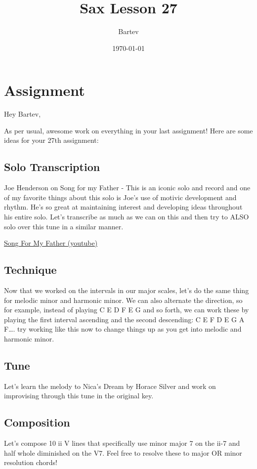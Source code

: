 \documentclass[11pt]{article}
\author{Bartev}
\date{\today}
\title{Sax Lesson 27}
\let\maketitle\relax %
\begin{document}
\maketitle
\tableofcontents


\section{Assignment}
\label{sec:org02bc423}

Hey Bartev,

As per usual, awesome work on everything in your last assignment! Here are some ideas for your 27th assignment:

\subsection{Solo Transcription}
\label{sec:orgd719371}
Joe Henderson on Song for my Father - This is an iconic solo and record and one of my favorite things about this solo is Joe's use of motivic development and rhythm. He's so great at maintaining interest and developing ideas throughout his entire solo. Let's transcribe as much as we can on this and then try to ALSO solo over this tune in a similar manner.

\href{https://www.youtube.com/watch?v=CWeXOm49kE0}{Song For My Father (youtube)}

\subsection{Technique}
\label{sec:orgcfe0885}
Now that we worked on the intervals in our major scales, let's do the same thing for melodic minor and harmonic minor. We can also alternate the direction, so for example, instead of playing C E D F E G and so forth, we can work these by playing the first interval ascending and the second descending: C E F D E G A F\ldots{}. try working like this now to change things up as you get into melodic and harmonic minor.


\subsection{Tune}
\label{sec:orgdaf4d02}
Let's learn the melody to Nica's Dream by Horace Silver and work on improvising through this tune in the original key.

\subsection{Composition}
\label{sec:org17f5176}
Let's compose 10 ii V lines that specifically use minor major 7 on the ii-7 and half whole diminished on the V7. Feel free to resolve these to major OR minor resolution chords!
\end{document}
